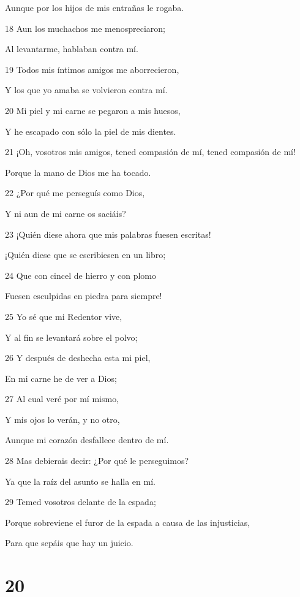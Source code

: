 \par Aunque por los hijos de mis entrañas le rogaba.
\par 18 Aun los muchachos me menospreciaron;
\par Al levantarme, hablaban contra mí.
\par 19 Todos mis íntimos amigos me aborrecieron,
\par Y los que yo amaba se volvieron contra mí.
\par 20 Mi piel y mi carne se pegaron a mis huesos,
\par Y he escapado con sólo la piel de mis dientes.
\par 21 ¡Oh, vosotros mis amigos, tened compasión de mí, tened compasión de mí!
\par Porque la mano de Dios me ha tocado.
\par 22 ¿Por qué me perseguís como Dios,
\par Y ni aun de mi carne os saciáis?
\par 23 ¡Quién diese ahora que mis palabras fuesen escritas!
\par ¡Quién diese que se escribiesen en un libro;
\par 24 Que con cincel de hierro y con plomo
\par Fuesen esculpidas en piedra para siempre!
\par 25 Yo sé que mi Redentor vive,
\par Y al fin se levantará sobre el polvo;
\par 26 Y después de deshecha esta mi piel,
\par En mi carne he de ver a Dios;
\par 27 Al cual veré por mí mismo,
\par Y mis ojos lo verán, y no otro,
\par Aunque mi corazón desfallece dentro de mí.
\par 28 Mas debierais decir: ¿Por qué le perseguimos?
\par Ya que la raíz del asunto se halla en mí.
\par 29 Temed vosotros delante de la espada;
\par Porque sobreviene el furor de la espada a causa de las injusticias,
\par Para que sepáis que hay un juicio.

\chapter{20}

